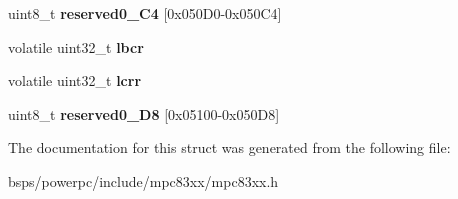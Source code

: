 \begin{DoxyCompactItemize}
uint8\+\_\+t {\bfseries reserved0\+\_\+C4} \mbox{[}0x050\+D0-\/0x050\+C4\mbox{]}
\item 
\mbox{\label{structm83xxLBCRegisters___a89dee048f213cf5b8ce06f111f06d801}} 
volatile uint32\+\_\+t {\bfseries lbcr}
\item 
\mbox{\label{structm83xxLBCRegisters___ad514b02d125a9683df0d308aec00a299}} 
volatile uint32\+\_\+t {\bfseries lcrr}
\item 
\mbox{\label{structm83xxLBCRegisters___a4ac6071a0a773c71496e920538ac900d}} 
uint8\+\_\+t {\bfseries reserved0\+\_\+D8} \mbox{[}0x05100-\/0x050\+D8\mbox{]}
\end{DoxyCompactItemize}


The documentation for this struct was generated from the following file\+:\begin{DoxyCompactItemize}
\item 
bsps/powerpc/include/mpc83xx/mpc83xx.\+h\end{DoxyCompactItemize}
